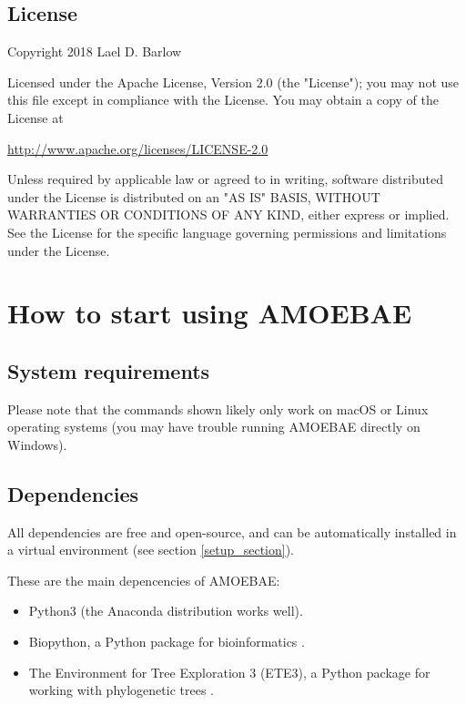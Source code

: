 \documentclass[12pt,letterpaper]{article}
\begin{document}
\begin{linenumbers}
\subsection{License}
\label{license_section}

Copyright 2018 Lael D. Barlow

Licensed under the Apache License, Version 2.0 (the "License"); you may not use this file except in compliance with the License. You may obtain a copy of the License at

\url{http://www.apache.org/licenses/LICENSE-2.0}

Unless required by applicable law or agreed to in writing, software distributed under the License is distributed on an "AS IS" BASIS, WITHOUT WARRANTIES OR CONDITIONS OF ANY KIND, either express or implied. See the License for the specific language governing permissions and limitations under the License.


\section{How to start using AMOEBAE}

\subsection{System requirements}

Please note that the commands shown likely only work on macOS or Linux operating
systems (you may have trouble running AMOEBAE directly on Windows). 


\subsection{Dependencies}
\label{dependencies_section}

All dependencies are free and open-source, and can be automatically installed
in a virtual environment (see section \ref{setup_section}).

These are the main depencencies of AMOEBAE:

\begin{itemize}

\item Python3 (the Anaconda distribution works well).

\item Biopython, a Python package for bioinformatics \citep{cock2009}.

\item The Environment for Tree Exploration 3 (ETE3), a Python package for
    working with phylogenetic trees \citep{huerta-cepas2016}.


\end{itemize}
\end{linenumbers}
\end{document}

